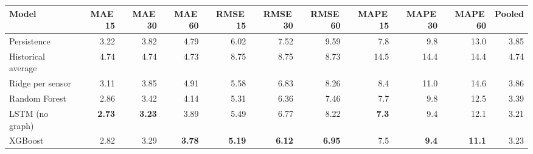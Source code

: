 \begin{tabular}{@{}lrrrrrrrrrr@{}}
\toprule
Model & MAE\,15 & MAE\,30 & MAE\,60 & RMSE\,15 & RMSE\,30 & RMSE\,60 & MAPE\,15 & MAPE\,30 & MAPE\,60 & Pooled \\
\midrule
Persistence & 3.22 & 3.82 & 4.79 & 6.02 & 7.52 & 9.59 & 7.8 & 9.8 & 13.0 & 3.85 \\
Historical average & 4.74 & 4.74 & 4.73 & 8.75 & 8.75 & 8.73 & 14.5 & 14.4 & 14.4 & 4.74 \\
Ridge per sensor & 3.11 & 3.85 & 4.91 & 5.58 & 6.83 & 8.26 & 8.4 & 11.0 & 14.6 & 3.86 \\
Random Forest & 2.86 & 3.42 & 4.14 & 5.31 & 6.36 & 7.46 & 7.7 & 9.8 & 12.5 & 3.39 \\
LSTM (no graph) & \textbf{2.73} & \textbf{3.23} & 3.89 & 5.49 & 6.77 & 8.22 & \textbf{7.3} & 9.4 & 12.1 & 3.21 \\
XGBoost & 2.82 & 3.29 & \textbf{3.78} & \textbf{5.19} & \textbf{6.12} & \textbf{6.95} & 7.5 & \textbf{9.4} & \textbf{11.1} & 3.23 \\
\bottomrule
\end{tabular}
